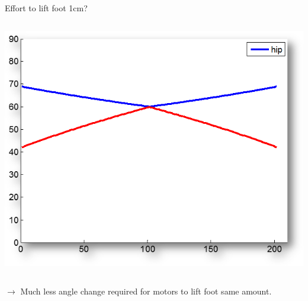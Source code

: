 \documentclass[compress]{beamer}
\begin{document}
\begin{frame}{Effort to lift foot 1cm?}
{\begin{columns}
\begin{column}{0.5\linewidth}
            \begin{center}
                \includegraphics[width=\linewidth]{graph2}
            \end{center}

        \end{column}
    \end{columns}

    $\rightarrow$ Much less angle change required for motors to lift foot same amount.
    }
\end{frame}
\end{document}
